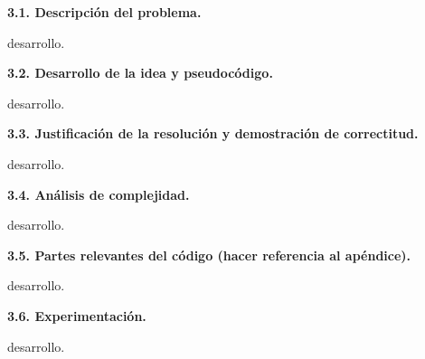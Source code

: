 \noindent
\textbf{3.1. Descripción del problema.}

\vspace*{0.3cm}

desarrollo.

\vspace*{0.75cm} \noindent



\noindent
\textbf{3.2. Desarrollo de la idea y pseudocódigo.}

\vspace*{0.3cm}

desarrollo.


\vspace*{0.75cm} \noindent


\noindent
\textbf{3.3. Justificación de la resolución y demostración de correctitud.}

\vspace*{0.3cm}

desarrollo.


\vspace*{0.75cm} \noindent



\noindent
\textbf{3.4. Análisis de complejidad.}

\vspace*{0.3cm}

desarrollo.


\vspace*{0.75cm} \noindent



\noindent
\textbf{3.5. Partes relevantes del código (hacer referencia al apéndice).}

\vspace*{0.3cm}

desarrollo.


\vspace*{0.75cm} \noindent



\noindent
\textbf{3.6. Experimentación.}

\vspace*{0.3cm}

desarrollo.
